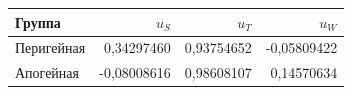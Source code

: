 \begin{tabular}{@{}lrrr@{}}
\toprule
Группа & $u_S$ & $u_T$ & $u_W$ \\
\midrule
Перигейная & 0{,}34297460 & 0{,}93754652 & -0{,}05809422 \\
Апогейная & -0{,}08008616 & 0{,}98608107 & 0{,}14570634 \\
\bottomrule
\end{tabular}
